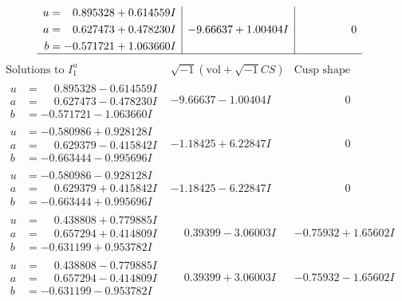 \documentclass[1p]{elsarticle_modified}
\theoremstyle{definition}
\newcommand{\I}{\sqrt{-1}}
\begin{document}
$$\begin{array}{c|c|c}
\begin{aligned}
u &= \phantom{-}0.895328 + 0.614559 I \\
a &= \phantom{-}0.627473 + 0.478230 I \\
b &= -0.571721 + 1.063660 I\end{aligned}
 & -9.66637 + 1.00404 I & \phantom{-0.000000 } 0\\
 \hline 
 \end{array}$$\newpage$$\begin{array}{c|c|c}  
\text{Solutions to }I^u_{1}& \I (\text{vol} + \sqrt{-1}CS) & \text{Cusp shape}\\
 \hline 
\begin{aligned}
u &= \phantom{-}0.895328 - 0.614559 I \\
a &= \phantom{-}0.627473 - 0.478230 I \\
b &= -0.571721 - 1.063660 I\end{aligned}
 & -9.66637 - 1.00404 I & \phantom{-0.000000 } 0 \\ \hline\begin{aligned}
u &= -0.580986 + 0.928128 I \\
a &= \phantom{-}0.629379 - 0.415842 I \\
b &= -0.663444 - 0.995696 I\end{aligned}
 & -1.18425 + 6.22847 I & \phantom{-0.000000 } 0 \\ \hline\begin{aligned}
u &= -0.580986 - 0.928128 I \\
a &= \phantom{-}0.629379 + 0.415842 I \\
b &= -0.663444 + 0.995696 I\end{aligned}
 & -1.18425 - 6.22847 I & \phantom{-0.000000 } 0 \\ \hline\begin{aligned}
u &= \phantom{-}0.438808 + 0.779885 I \\
a &= \phantom{-}0.657294 + 0.414809 I \\
b &= -0.631199 + 0.953782 I\end{aligned}
 & \phantom{-}0.39399 - 3.06003 I & -0.75932 + 1.65602 I \\ \hline\begin{aligned}
u &= \phantom{-}0.438808 - 0.779885 I \\
a &= \phantom{-}0.657294 - 0.414809 I \\
b &= -0.631199 - 0.953782 I\end{aligned}
 & \phantom{-}0.39399 + 3.06003 I & -0.75932 - 1.65602 I \\ \hline\begin{aligned}

\end{aligned}
\end{array}$$
\end{document}
